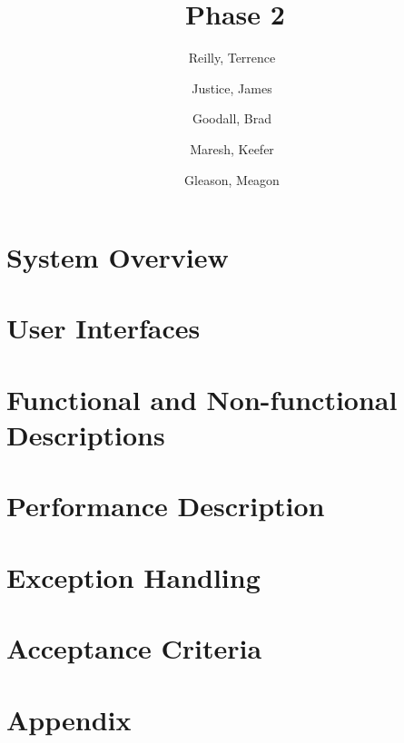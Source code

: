 \documentclass[a4paper,12pt]{article}
\author{
    Reilly, Terrence\
    \and
    Justice, James\
    \and
    Goodall, Brad\
    \and
    Maresh, Keefer\
    \and
    Gleason, Meagon\
}
\title{Phase 2}
\begin{document}
    \nocite{*}
    \maketitle

    \section*{System Overview}
        

    \section*{User Interfaces}
        

    \section*{Functional and Non-functional Descriptions}
        

    \section*{Performance Description}
        

    \section*{Exception Handling}
        

    \section*{Acceptance Criteria}
        

    
    

    \section*{Appendix}
        
\end{document}
